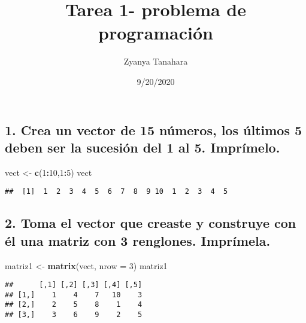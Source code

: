 \documentclass[
]{article}
\title{Tarea 1- problema de programación}
\author{Zyanya Tanahara}
\date{9/20/2020}
\newenvironment{Shaded}{\begin{snugshade}}{\end{snugshade}}
\newcommand{\DataTypeTok}[1]{\textcolor[rgb]{0.13,0.29,0.53}{#1}}
\newcommand{\DecValTok}[1]{\textcolor[rgb]{0.00,0.00,0.81}{#1}}
\newcommand{\KeywordTok}[1]{\textcolor[rgb]{0.13,0.29,0.53}{\textbf{#1}}}
\newcommand{\NormalTok}[1]{#1}
\newcommand{\OperatorTok}[1]{\textcolor[rgb]{0.81,0.36,0.00}{\textbf{#1}}}
\newcommand{\StringTok}[1]{\textcolor[rgb]{0.31,0.60,0.02}{#1}}
\begin{document}
\maketitle

\hypertarget{crea-un-vector-de-15-nuxfameros-los-uxfaltimos-5-deben-ser-la-sucesiuxf3n-del-1-al-5.-impruxedmelo.}{%
\subsection{1. Crea un vector de 15 números, los últimos 5 deben ser la
sucesión del 1 al 5.
Imprímelo.}\label{crea-un-vector-de-15-nuxfameros-los-uxfaltimos-5-deben-ser-la-sucesiuxf3n-del-1-al-5.-impruxedmelo.}}

\begin{Shaded}
\begin{Highlighting}[]
\NormalTok{vect <-}\StringTok{ }\KeywordTok{c}\NormalTok{(}\DecValTok{1}\OperatorTok{:}\DecValTok{10}\NormalTok{,}\DecValTok{1}\OperatorTok{:}\DecValTok{5}\NormalTok{)}
\NormalTok{vect}
\end{Highlighting}
\end{Shaded}

\begin{verbatim}
##  [1]  1  2  3  4  5  6  7  8  9 10  1  2  3  4  5
\end{verbatim}

\hypertarget{toma-el-vector-que-creaste-y-construye-con-uxe9l-una-matriz-con-3-renglones.-impruxedmela.}{%
\subsection{2. Toma el vector que creaste y construye con él una matriz
con 3 renglones.
Imprímela.}\label{toma-el-vector-que-creaste-y-construye-con-uxe9l-una-matriz-con-3-renglones.-impruxedmela.}}

\begin{Shaded}
\begin{Highlighting}[]
\NormalTok{matriz1 <-}\StringTok{ }\KeywordTok{matrix}\NormalTok{(vect, }\DataTypeTok{nrow =} \DecValTok{3}\NormalTok{)}
\NormalTok{matriz1}
\end{Highlighting}
\end{Shaded}

\begin{verbatim}
##      [,1] [,2] [,3] [,4] [,5]
## [1,]    1    4    7   10    3
## [2,]    2    5    8    1    4
## [3,]    3    6    9    2    5
\end{verbatim}
\end{document}
